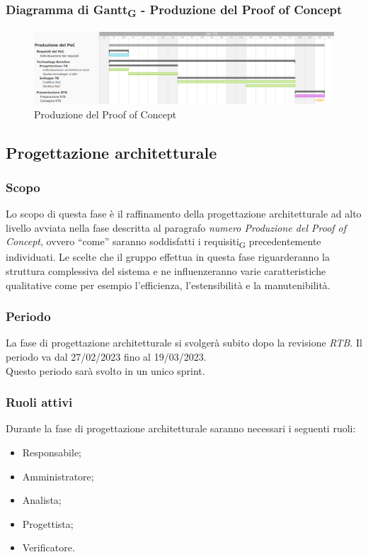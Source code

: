 \subsubsection{Diagramma di Gantt\textsubscript{G} - Produzione del Proof of Concept}

\begin{figure}[H]
\centering
\includegraphics[width=\textwidth]{img/4_produzione.png}
\caption{Produzione del Proof of Concept}
\end{figure}

\subsection{Progettazione architetturale}
\subsubsection{Scopo}
Lo scopo di questa fase è il raffinamento della progettazione architetturale ad alto livello avviata nella fase descritta al paragrafo \textit{numero Produzione del Proof of Concept}, ovvero “come” saranno soddisfatti i requisiti\textsubscript{G} precedentemente individuati.
Le scelte che il gruppo effettua in questa fase riguarderanno la struttura complessiva del sistema e ne influenzeranno varie caratteristiche qualitative come per esempio l’efficienza, l’estensibilità e la manutenibilità.

\subsubsection{Periodo}
La fase di progettazione architetturale si svolgerà subito dopo la revisione \textit{RTB}. Il periodo va dal 27/02/2023 fino al 19/03/2023.\\
Questo periodo sarà svolto in un unico sprint.

\subsubsection{Ruoli attivi}
Durante la fase di progettazione architetturale saranno necessari i seguenti ruoli:
\begin{itemize}
	\item Responsabile;
    \item Amministratore;
    \item Analista;
    \item Progettista;
    \item Verificatore.
\end{itemize}

